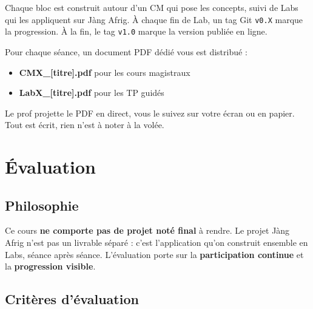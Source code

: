 \documentclass[11pt,a4paper]{article}
\begin{document}
\bigskip

\begin{infobox}
Chaque bloc est construit autour d'un CM qui pose les concepts, suivi de
Labs qui les appliquent sur Jàng Afrig. À chaque fin de Lab, un tag Git
\texttt{v0.X} marque la progression. À la fin, le tag \texttt{v1.0} marque
la version publiée en ligne.
\end{infobox}

\bigskip

\begin{retenirbox}
Pour chaque séance, un document PDF dédié vous est distribué :
\begin{itemize}[nosep]
    \item \textbf{CMX\_[titre].pdf} pour les cours magistraux
    \item \textbf{LabX\_[titre].pdf} pour les TP guidés
\end{itemize}
Le prof projette le PDF en direct, vous le suivez sur votre écran ou en
papier. Tout est écrit, rien n'est à noter à la volée.
\end{retenirbox}

\newpage

\section{Évaluation}
\label{sec:evaluation}

\subsection{Philosophie}

Ce cours \textbf{ne comporte pas de projet noté final} à rendre. Le projet
Jàng Afrig n'est pas un livrable séparé : c'est l'application qu'on construit
ensemble en Labs, séance après séance. L'évaluation porte sur la
\textbf{participation continue} et la \textbf{progression visible}.

\subsection{Critères d'évaluation}
\end{document}
